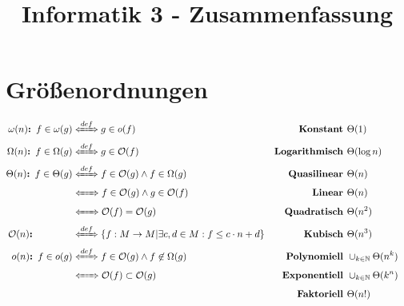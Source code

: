 \documentclass{article}
\title{Informatik 3 - Zusammenfassung}
\begin{document}
	\section*{Gr\"o\ss enordnungen}
		\begin{align*}
			\textbf{$\omega(n)$: } f \in \omega (g) & \xLeftrightarrow{def} g \in o(f) & \textbf{Konstant } & \Theta(1) & \\
			\textbf{$\Omega(n)$: } f \in \Omega (g) & \xLeftrightarrow{def} g \in \mathcal{O}(f) & \textbf{Logarithmisch } & \Theta(\log n)\\
			\textbf{$\Theta (n)$: } f \in \Theta (g) & \xLeftrightarrow{def} f \in \mathcal{O}(g) \wedge f \in \Omega (g) & \textbf{Quasilinear } & \Theta(n)\\
			& \xLeftrightarrow{\ \ \ \ } f \in \mathcal{O}(g) \wedge g \in \mathcal{O}(f) & \textbf{Linear } & \Theta(n)\\
			& \xLeftrightarrow{\ \ \ \ } \mathcal{O}(f) = \mathcal{O}(g) & \textbf{Quadratisch } & \Theta(n^2)\\
			\textbf{$\mathcal{O}(n)$:}\hspace{1.45cm} & \xLeftrightarrow{def} \{f: M \rightarrow M | \exists c,d \in M: f \leq c \cdot n + d\} & \textbf{Kubisch } & \Theta(n^3)\\
			\textbf{$o(n)$: } f \in o(g) & \xLeftrightarrow{def} f \in \mathcal{O}(g) \wedge f \not\in \Omega (g) & \textbf{Polynomiell } & \cup_{k \in \mathbb{N}} \Theta(n^k)\\
			& \xLeftrightarrow{\ \ \ \ } \mathcal{O}(f) \subset \mathcal{O} (g) & \textbf{Exponentiell } & \cup_{k \in \mathbb{N}} \Theta(k^n)\\
			& & \textbf{Faktoriell } & \Theta (n!)\\
		\end{align*}
\end{document}
